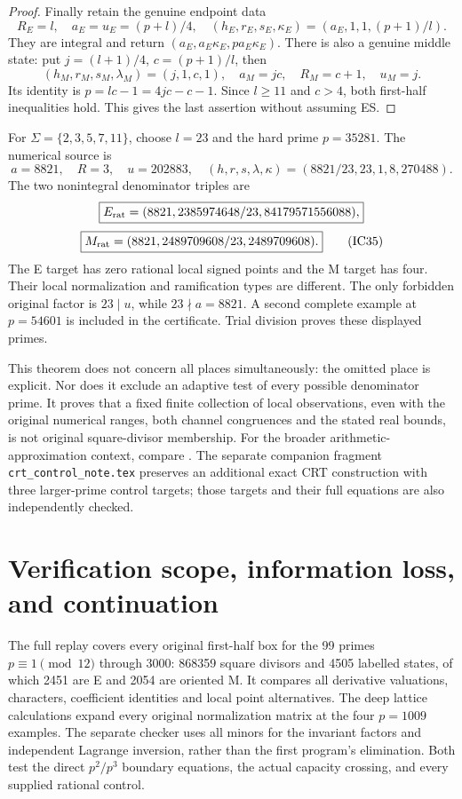 \begin{proof}
Finally retain the genuine endpoint data
\[
 R_E=l,\quad a_E=u_E=(p+l)/4,\quad
 (h_E,r_E,s_E,\kappa_E)=(a_E,1,1,(p+1)/l).
\]
They are integral and return $(a_E,a_E\kappa_E,pa_E\kappa_E)$.
There is also a genuine middle state: put
$j=(l+1)/4$, $c=(p+1)/l$, then
\[
 (h_M,r_M,s_M,\lambda_M)=(j,1,c,1),\quad a_M=jc,\quad
 R_M=c+1,\quad u_M=j.
\]
Its identity is $p=lc-1=4jc-c-1$. Since $l\ge11$ and $c>4$, both first-half
inequalities hold. This gives the last assertion without assuming ES.
\end{proof}

For $\Sigma=\{2,3,5,7,11\}$, choose $l=23$ and the hard prime $p=35281$.
The numerical source is
\[
 a=8821,\quad R=3,\quad u=202883,
 \quad(h,r,s,\lambda,\kappa)=(8821/23,23,1,8,270488).
\]
The two nonintegral denominator triples are
\[
 \boxed{E_{\rm rat}=(8821,2385974648/23,84179571556088),}
\]
\[
 \boxed{M_{\rm rat}=(8821,2489709608/23,2489709608).}      \tag{IC35}
\]
The E target has zero rational local signed points and the M target has four.
Their local normalization and ramification types are different. The only forbidden original factor is
$23\mid u$, while $23\nmid a=8821$. A second complete example at $p=54601$ is
included in the certificate. Trial division proves these displayed primes.

This theorem does not concern all places simultaneously: the omitted place is
explicit. Nor does it exclude an adaptive test of every possible denominator
prime. It proves that a fixed finite collection of local observations, even
with the original numerical ranges, both channel congruences and the stated
real bounds, is not original square-divisor membership. For the broader
arithmetic-approximation context, compare \cite[Theorems 1.1, 1.8--1.9]{BL}.
The separate companion fragment \texttt{crt\_control\_note.tex} preserves an
additional exact CRT construction with three larger-prime control targets;
those targets and their full equations are also independently checked.

\section{Verification scope, information loss, and continuation}
The full replay covers every original first-half box for the 99 primes
$p\equiv1\pmod{12}$ through 3000: 868359 square divisors and 4505 labelled
states, of which 2451 are E and 2054 are oriented M. It compares all derivative
valuations, characters, coefficient identities and local point alternatives.
The deep lattice calculations expand every original normalization matrix at
the four $p=1009$ examples. The separate checker uses all minors for the
invariant factors and independent Lagrange inversion, rather than the first
program's elimination. Both test the direct $p^2/p^3$ boundary equations, the
actual capacity crossing, and every supplied rational control.


